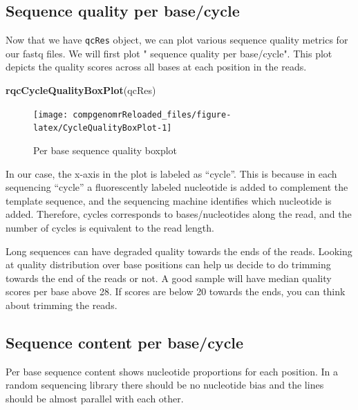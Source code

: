 \documentclass[12pt,]{krantz}
\newenvironment{Shaded}{\begin{snugshade}}{\end{snugshade}}
\newcommand{\KeywordTok}[1]{\textcolor[rgb]{0.13,0.29,0.53}{\textbf{#1}}}
\newcommand{\NormalTok}[1]{#1}
\begin{document}
\hypertarget{sequence-quality-per-basecycle}{%
\subsection{Sequence quality per base/cycle}\label{sequence-quality-per-basecycle}}

Now that we have \texttt{qcRes} object, we can plot various sequence quality metrics for our fastq files. We will first plot " sequence quality per base/cycle". This plot depicts the quality scores across all bases at each position in the reads.

\begin{Shaded}
\begin{Highlighting}[]
\KeywordTok{rqcCycleQualityBoxPlot}\NormalTok{(qcRes)}
\end{Highlighting}
\end{Shaded}

\begin{figure}

{\centering \texttt{[image: compgenomrReloaded\_files/figure-latex/CycleQualityBoxPlot-1]} 

}

\caption{Per base sequence quality boxplot}\label{fig:CycleQualityBoxPlot}
\end{figure}

In our case, the x-axis in the plot is labeled as ``cycle''. This is because in each sequencing ``cycle'' a fluorescently labeled nucleotide is added to complement the template sequence, and the sequencing machine identifies which nucleotide is added. Therefore, cycles corresponds to bases/nucleotides along the read, and the number of cycles is equivalent to the read length.

Long sequences can have degraded quality towards the ends of the reads. Looking at quality distribution over base positions can help us decide to do trimming towards the end of the reads or not. A good sample will have median quality scores per base above 28. If scores are below 20 towards the ends, you can think about trimming the reads.

\hypertarget{sequence-content-per-basecycle}{%
\subsection{Sequence content per base/cycle}\label{sequence-content-per-basecycle}}

Per base sequence content shows nucleotide proportions for each position. In a random sequencing library there should be no nucleotide bias and the lines should be almost parallel with each other.
\end{document}
